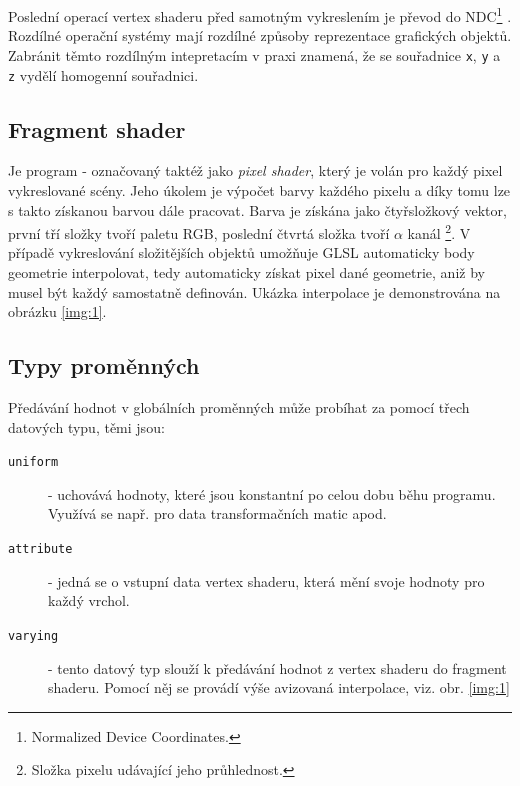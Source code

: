 Poslední operací vertex shaderu před samotným vykreslením je převod do NDC\footnote{Normalized Device Coordinates.} \cite{opengl}. Rozdílné operační systémy mají rozdílné způsoby reprezentace grafických objektů. Zabránit těmto rozdílným  intepretacím v praxi znamená, že se souřadnice \texttt{x}, \texttt{y} a \texttt{z} vydělí homogenní souřadnici.

\subsection{Fragment shader}
Je program - označovaný taktéž jako \textit{pixel shader}, který je volán pro každý pixel vykreslované scény. Jeho úkolem je výpočet barvy každého pixelu a díky tomu lze s takto získanou barvou  dále pracovat. Barva je získána jako čtyřsložkový vektor, první tří složky tvoří paletu RGB, poslední čtvrtá složka tvoří $\alpha$ kanál \footnote{Složka pixelu udávající jeho průhlednost.}. V případě vykreslování složitějších objektů umožňuje GLSL automaticky body geometrie interpolovat, tedy automaticky získat pixel dané geometrie, aniž by musel být každý samostatně definován. Ukázka interpolace je demonstrována na obrázku \ref{img:1}.

\newpage


\subsection{Typy proměnných}
Předávání hodnot v globálních proměnných může probíhat za pomocí třech datových typu, těmi jsou:
\begin{description}
	\item[\texttt{uniform}]  
	- uchovává hodnoty, které jsou konstantní po celou dobu běhu programu. Využívá se např. pro data transformačních matic apod.	
	\item[\texttt{attribute}] 
	- 	jedná se o vstupní data vertex shaderu, která mění svoje hodnoty pro každý vrchol. 
	\item[\texttt{varying}] 
	- tento datový typ slouží k předávání hodnot z vertex shaderu do fragment shaderu. Pomocí něj se provádí výše avizovaná interpolace, viz. obr. \ref{img:1} 

\end{description}


